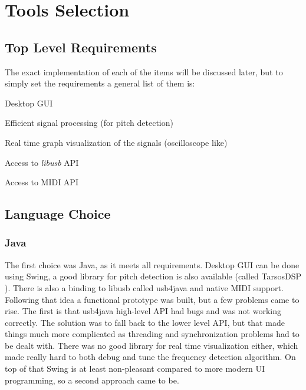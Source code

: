 \section{Tools Selection}
\label{tools-selection}

\subsection{Top Level Requirements}
The exact implementation of each of the items will be discussed later, but to
simply set the requirements a general list of them is:

\begin{itemlist}
  \item Desktop GUI
  \item Efficient signal processing (for pitch detection)
  \item Real time graph visualization of the signals (oscilloscope like)
  \item Access to \textit{libusb} \cite{libusb} API
  \item Access to MIDI API
\end{itemlist}

\subsection{Language Choice}

\subsubsection{Java}
The first choice was Java, as it meets all requirements. Desktop GUI can be done
using Swing, a good library for pitch detection is also available (called TarsosDSP \cite{TarsosDSP}).
There is also a binding to libusb called usb4java and native MIDI support. \\
Following that idea a functional prototype was built, but a few problems came to rise.
The first is that usb4java high-level API had bugs and was not working correctly.
The solution was to fall back to the lower level API, but that made things much
more complicated as threading and synchronization problems had to be dealt with.
There was no good library for
real time visualization either, which made really hard to both debug and tune the
frequency detection algorithm. On top of that Swing is at least non-pleasant
compared to more modern UI programming, so a second approach came to be.

